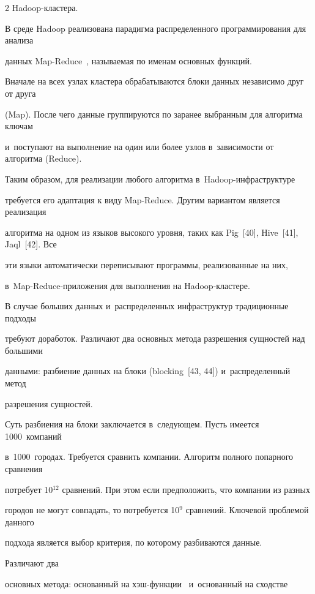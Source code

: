 \begin{multicols}{2}
Hadoop-клас\-тера.



  В среде Hadoop реализована парадигма распределенного программирования для анализа

данных Map-Reduce~\cite{38-vov, 39-vov}, называемая по именам основных функций.

Вначале на всех узлах кластера обрабатываются блоки данных независимо друг от друга

(Map). После чего данные группируются по заранее выбранным для алгоритма ключам

и~поступают на выполнение на один или более узлов в~зависимости от алгоритма (Reduce).



  Таким образом, для реализации любого алгоритма в~Hadoop-инфра\-струк\-ту\-ре

требуется его адап\-тация к виду Map-Reduce. Другим вариантом яв\-ля\-ется реализация

алгоритма на одном из языков \mbox{высокого} уровня, таких как Pig~[40], Hive~[41], Jaql~[42]. Все

эти языки автоматически переписывают программы, реализованные на них,

  в~Map-Reduce-при\-ло\-же\-ния для выполнения на Hadoop-клас\-тере.



  В случае больших данных и~распределенных инфраструктур традиционные подходы

требуют доработок. Различают два основных метода разрешения сущностей над большими

данными: разбиение данных на блоки (blocking~[43, 44]) и~распределенный метод

разрешения сущностей.



  Суть разбиения на блоки заключается в~сле\-ду\-ющем. Пусть имеется 1000~компаний

в~1000~городах. Требуется сравнить компании. Алгоритм полного попарного сравнения

потребует 10$^{12}$ сравнений. При этом если предположить, что компании из разных

городов не могут совпадать, то потребуется 10$^9$ сравнений. Ключевой проблемой данного

подхода является выбор критерия, по которому разбиваются данные.



Различают два

основных метода: основанный на хэш-функ\-ции~\cite{8-vov} и~основанный на сходстве


\end{multicols}

